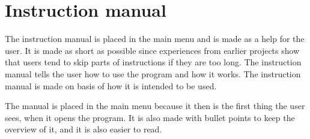 \section{Instruction manual}
The instruction manual is placed in the main menu and is made as a help for the user. It is made as short as possible since experiences from earlier projects show that users tend to skip parts of instructions if they are too long. The instruction manual tells the user how to use the program and how it works. The instruction manual is made on basis of how it is intended to be used.

The manual is placed in the main menu because it then is the first thing the user sees, when it opens the program. It is also made with bullet points to keep the overview of it, and it is also easier to read.